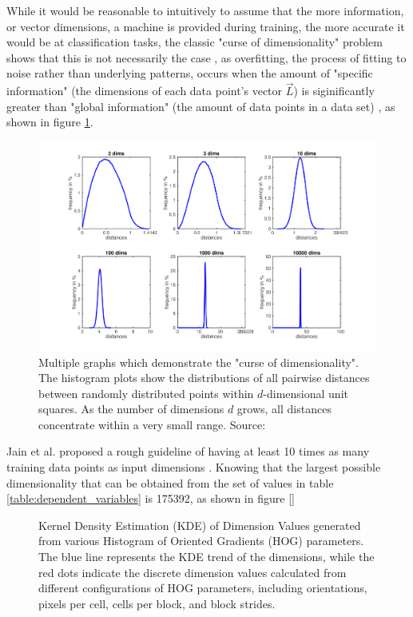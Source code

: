 While it would be reasonable to intuitively to assume that the more information, or vector dimensions, a machine is provided during training, the more accurate it would be at classification tasks, the classic "curse of dimensionality" problem shows that this is not necessarily the case \cite{jain_1982_39} \cite{friedman_1997_on}, as overfitting, the process of fitting to noise rather than underlying patterns, \cite{overfitting} occurs when the amount of "specific information" (the dimensions of each data point's vector $\vec{L}$) is siginificantly greater than "global information" (the amount of data points in a data set) \cite{overfitting} \cite{liu_2016_overfitting}, as shown in figure \ref{fig:curse_dim}. 

\begin{figure}
    \centering
    \includegraphics[width=\linewidth]{images/cursefigure.png}
    \caption{Multiple graphs which demonstrate the "curse of dimensionality". The histogram plots show the distributions of all pairwise distances between randomly distributed points within $d$-dimensional unit squares. As the number of dimensions $d$ grows, all distances concentrate within a very small range. Source: \cite{cornell_curse_notes}
}
    \label{fig:curse_dim}
\end{figure}

Jain et al. proposed a rough guideline of having at least 10 times as many training data points as input dimensions \cite{jain_2000_statistical}. Knowing that the largest possible dimensionality that can be obtained from the set of values in table \ref{table:dependent_variables} is 175392, as shown in figure \ref{}

\begin{figure}
    \centering    
    
    \caption{Kernel Density Estimation (KDE) of Dimension Values generated from various Histogram of Oriented Gradients (HOG) parameters. The blue line represents the KDE trend of the dimensions, while the red dots indicate the discrete dimension values calculated from different configurations of HOG parameters, including orientations, pixels per cell, cells per block, and block strides.}
    \label{fig:dim_distribution}
\end{figure}

